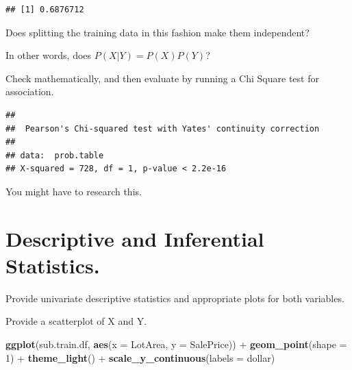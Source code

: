 \documentclass[]{article}
\newenvironment{Shaded}{\begin{snugshade}}{\end{snugshade}}
\newcommand{\KeywordTok}[1]{\textcolor[rgb]{0.13,0.29,0.53}{\textbf{{#1}}}}
\newcommand{\DataTypeTok}[1]{\textcolor[rgb]{0.13,0.29,0.53}{{#1}}}
\newcommand{\DecValTok}[1]{\textcolor[rgb]{0.00,0.00,0.81}{{#1}}}
\newcommand{\StringTok}[1]{\textcolor[rgb]{0.31,0.60,0.02}{{#1}}}
\newcommand{\NormalTok}[1]{{#1}}
\begin{document}
\begin{verbatim}
## [1] 0.6876712
\end{verbatim}

Does splitting the training data in this fashion make them independent?

In other words, does \(P(X|Y)=P(X)P(Y)\)?

Check mathematically, and then evaluate by running a Chi Square test for
association.

\begin{Shaded}
\end{Shaded}

\begin{verbatim}
## 
##  Pearson's Chi-squared test with Yates' continuity correction
## 
## data:  prob.table
## X-squared = 728, df = 1, p-value < 2.2e-16
\end{verbatim}

You might have to research this.

\section{Descriptive and Inferential
Statistics.}\label{descriptive-and-inferential-statistics.}

Provide univariate descriptive statistics and appropriate plots for both
variables.

Provide a scatterplot of X and Y.

\begin{Shaded}
\begin{Highlighting}[]
\KeywordTok{ggplot}\NormalTok{(sub.train.df, }\KeywordTok{aes}\NormalTok{(}\DataTypeTok{x =} \NormalTok{LotArea, }\DataTypeTok{y =} \NormalTok{SalePrice)) +}\StringTok{ }\KeywordTok{geom_point}\NormalTok{(}\DataTypeTok{shape =} \DecValTok{1}\NormalTok{) +}\StringTok{ }
\StringTok{    }\KeywordTok{theme_light}\NormalTok{() +}\StringTok{ }\KeywordTok{scale_y_continuous}\NormalTok{(}\DataTypeTok{labels =} \NormalTok{dollar)}
\end{Highlighting}
\end{Shaded}
\end{document}
